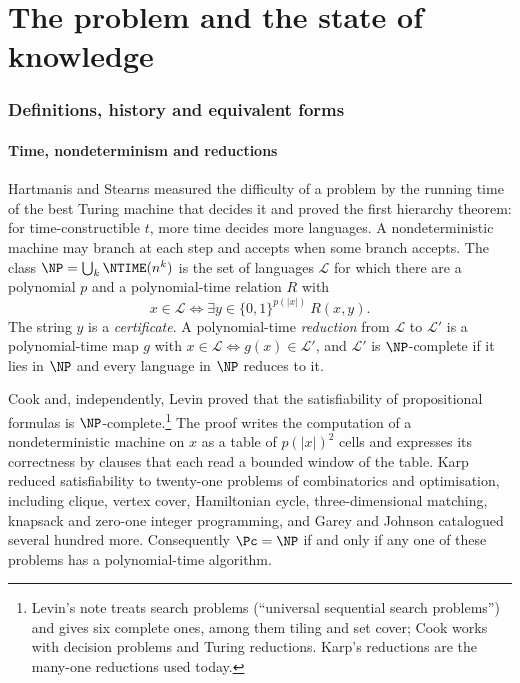 
\part{The problem and the state of knowledge}

\section{Definitions, history and equivalent forms}\label{sec:history}

\subsection{Time, nondeterminism and reductions}
Hartmanis and Stearns \cite{HS65} measured the difficulty of a problem by the
running time of the best Turing machine that decides it and proved the first
hierarchy theorem: for time-constructible $t$, more time decides more
languages. A nondeterministic machine may branch at each step and accepts when
some branch accepts. The class $\NP=\bigcup_k\NTIME(n^k)$ is the set of
languages $\mathcal L$ for which there are a polynomial $p$ and a polynomial-time
relation $R$ with
\[
x\in\mathcal L\iff \exists y\in\{0,1\}^{p(|x|)}\ R(x,y).
\]
The string $y$ is a \emph{certificate}. A polynomial-time \emph{reduction} from
$\mathcal L$ to $\mathcal L'$ is a polynomial-time map $g$ with $x\in\mathcal
L\iff g(x)\in\mathcal L'$, and $\mathcal L'$ is $\NP$-complete if it lies in
$\NP$ and every language in $\NP$ reduces to it.

Cook \cite{Coo71} and, independently, Levin \cite{Lev73} proved that the
satisfiability of propositional formulas is $\NP$-complete.\footnote{Levin's
note treats search problems (``universal sequential search problems'') and
gives six complete ones, among them tiling and set cover; Cook works with
decision problems and Turing reductions. Karp's reductions are the many-one
reductions used today.} The proof writes the computation of a nondeterministic
machine on $x$ as a table of $p(|x|)^2$ cells and expresses its correctness by
clauses that each read a bounded window of the table. Karp \cite{Kar72} reduced
satisfiability to twenty-one problems of combinatorics and optimisation,
including clique, vertex cover, Hamiltonian cycle, three-dimensional matching,
knapsack and zero-one integer programming, and Garey and Johnson \cite{GJ79}
catalogued several hundred more. Consequently $\Pc=\NP$ if and only if any one
of these problems has a polynomial-time algorithm.


